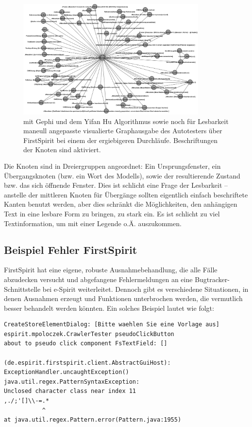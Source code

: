 \begin{figure}
	\centering
	\includegraphics[width=0.85\textwidth]{bilder/model_freespirit.png}
	\caption{mit Gephi und dem Yifan Hu Algorithmus \cite{hu2005efficient}
    sowie noch für Lesbarkeit maneull angepasste visualierte Graphausgabe 
	des Autotesters über FirstSpirit bei einem der ergiebigeren Durchläufe.
	Beschriftungen der Knoten sind aktiviert.}
	\label{fig:model_freespirit_06.10.2015}
\end{figure}



Die Knoten sind in Dreiergruppen angeordnet: Ein Ursprungsfenster, ein Übergangsknoten
(bzw. ein Wort des Modells), sowie der resultierende Zustand bzw. das sich öffnende Fenster.
Dies ist schlicht eine Frage der Lesbarkeit -- anstelle der mittleren Knoten für Übergänge sollten
eigentlich einfach beschriftete Kanten benutzt werden, aber dies schränkt die Möglichkeiten,
den anhängigen Text in eine lesbare Form zu bringen, zu stark ein. Es ist schlicht zu viel
Textinformation, um mit einer Legende o.Ä. auszukommen.

\subsection{Beispiel Fehler FirstSpirit}

FirstSpirit hat eine eigene, robuste Ausnahmebehandlung, die alle Fälle abzudecken
versucht und abgefangene Fehlermeldungen an eine Bugtracker-Schnittstelle bei e-Spirit
weiterleitet. Dennoch gibt es verschiedene Situationen, in denen Ausnahmen erzeugt
und Funktionen unterbrochen werden, die vermutlich besser behandelt werden könnten.
Ein solches Beispiel lautet wie folgt:

\begin{lstlisting}[float=!ht,label=fmjson,caption={Ausnahme FirstSpirit bei Eingabe in Suchfeld}]
CreateStoreElementDialog: [Bitte waehlen Sie eine Vorlage aus]
espirit.mpoloczek.CrawlerTester pseudoClickButton
about to pseudo click component FsTextField: []

(de.espirit.firstspirit.client.AbstractGuiHost):
ExceptionHandler.uncaughtException()
java.util.regex.PatternSyntaxException: 
Unclosed character class near index 11
,./;'[]\\-=.*
           ^
at java.util.regex.Pattern.error(Pattern.java:1955)
\end{lstlisting}

